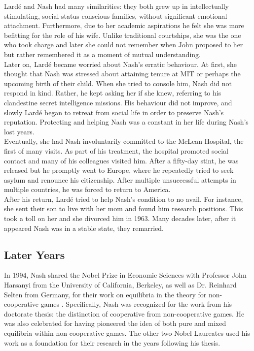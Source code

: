 \documentclass[12pt]{article}
\begin{document}
Lard\'e and Nash had many similarities: they both grew up in intellectually stimulating, social-status conscious families, without significant emotional attachment. Furthermore, due to her academic aspirations he felt she was more befitting for the role of his wife. Unlike traditional courtships, she was the one who took charge and later she could not remember when John proposed to her but rather remembered it as a moment of mutual understanding.\\

Later on, Lard\'e became worried about Nash's erratic behaviour. At first, she thought that Nash was stressed about attaining tenure at MIT or perhaps the upcoming birth of their child. When she tried to console him, Nash did not respond in kind. Rather, he kept asking her if she knew, referring to his clandestine secret intelligence missions. His behaviour did not improve, and slowly Lard\'e began to retreat from social life in order to preserve Nash's reputation. Protecting and helping Nash was a constant in her life during Nash's lost years.\\

Eventually, she had Nash involuntarily committed to the McLean Hospital, the first of many visits. As part of his treatment, the hospital promoted social contact and many of his colleagues visited him. After a fifty-day stint, he was released but he promptly went to Europe, where he repeatedly tried to seek asylum and renounce his citizenship. After multiple unsuccessful attempts in multiple countries, he was forced to return to America.\\

After his return, Lard\'e tried to help Nash's condition to no avail. For instance, she sent their son to live with her mom and found him research positions. This took a toll on her and she divorced him in 1963. Many decades later, after it appeared Nash was in a stable state, they remarried.

\subsection{Later Years}

In 1994, Nash shared the Nobel Prize in Economic Sciences with Professor John Harsanyi from the University of California, Berkeley, as well as Dr. Reinhard Selten from Germany, for their work on equilibria in the theory for non-cooperative games \cite{25}. Specifically, Nash was recognized for the work from his doctorate thesis: the distinction of cooperative from non-cooperative games. He was also celebrated for having pioneered the idea of both pure and mixed equilibria within non-cooperative games\cite{25}. The other two Nobel Laureates used his work as a foundation for their research in the years following his thesis.
\end{document}
